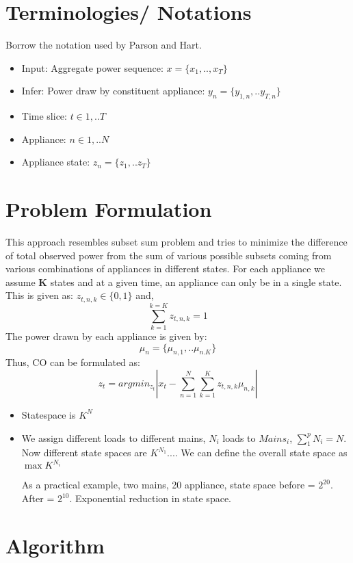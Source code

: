 \documentclass[conference]{IEEEtran}
\begin{document}
\section{Terminologies/ Notations}
Borrow the notation used by Parson and Hart.
\begin{itemize}
\item Input: Aggregate power sequence: $x=\{ x_1,..,x_T\}$
\item Infer: Power draw by constituent appliance: $y_n=\{y_{1,n},..y_{T,n}\}$
\item Time slice: $t\in {1,..T}$
\item Appliance: $n\in{1,..N}$
\item Appliance state: $z_n=\{z_1,..z_T\}$
\end{itemize}

\section{Problem Formulation}
This approach resembles subset sum problem and tries to minimize the difference of total observed power from the sum of various possible subsets coming from various combinations of appliances in different states. For each appliance we assume \textbf{K} states and at a given time, an appliance can only be in a single state. This is given as: 
$z_{t,n,k}\in\{0,1\} $ and, $$\sum\limits_{k=1}^{k=K} z_{t,n,k}=1$$The power drawn by each appliance is given by:
$$\mu_n=\{\mu_{n,1},..\mu_{n.K}\}$$ Thus, CO can be formulated as:
$$z_t=arg min_{z_t}|x_t-\sum\limits_{n=1}^{N}\sum\limits_{k=1}^{K}z_{t,n,k}\mu_{n,k}|$$

\begin{itemize}
\item Statespace is $K^N$
\item We assign different loads to different mains, $N_i$ loads to $Mains_i$, $\sum\limits_{1}^{p}{N_i}=N$. Now different state spaces are
$K^{N_1}$.... We can define the overall state space as $\max{K^{N_i}}$

As a practical example, two mains, 20 appliance, state space before = $2^{20}$. After = $2^{10}$. Exponential reduction in state space.

\end{itemize}

\section{Algorithm}
\end{document}
